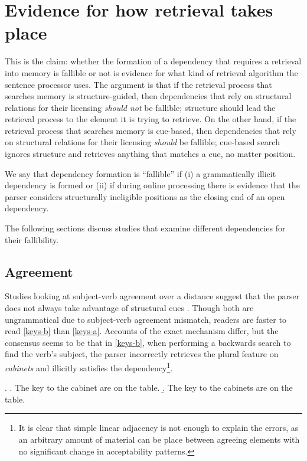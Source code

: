 \section{Evidence for how retrieval takes place}

This is the claim: whether the formation of a dependency that requires a retrieval into memory is fallible or not is evidence for what kind of retrieval algorithm the sentence processor uses. The argument is that if the retrieval process that searches memory is structure-guided, then dependencies that rely on structural relations for their licensing \emph{should not} be fallible; structure should lead the retrieval process to the element it is trying to retrieve. On the other hand, if the retrieval process that searches memory is cue-based, then dependencies that rely on structural relations for their licensing \emph{should} be fallible; cue-based search ignores structure and retrieves anything that matches a cue, no matter position.

We say that dependency formation is ``fallible'' if (i) a grammatically illicit dependency is formed or (ii) if during online processing there is evidence that the parser considers structurally ineligible positions as the closing end of an open dependency.

The following sections discuss studies that examine different dependencies for their fallibility. 

\subsection{Agreement}

Studies looking at subject-verb agreement over a distance suggest that the parser does not always take advantage of structural cues \citep{pearlmutter99, wagers09, alcocer09}. Though both are ungrammatical due to subject-verb agreement mismatch, readers are faster to read \ref{keys-b} than \ref{keys-a}. Accounts of the exact mechanism differ, but the consensus seems to be that in \ref{keys-b}, when performing a backwards search to find the verb's subject, the parser incorrectly retrieves the plural feature on \emph{cabinets} and illicitly satisfies the dependency\footnote{It is clear that simple linear adjacency is not enough to explain the errors, as an arbitrary amount of material can be place between agreeing elements with no significant change in acceptability patterns.}. 

\ex.  \a. The key to the cabinet are on the table. \label{keys-a}
      \b. The key to the cabinets are on the table.\label{keys-b}

